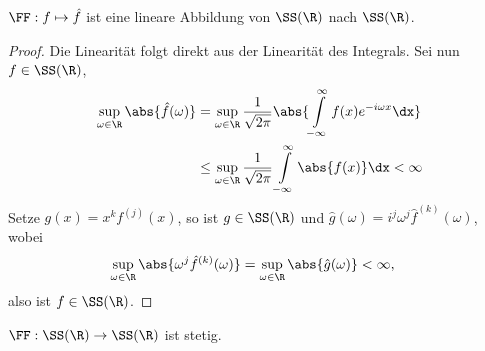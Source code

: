 \begin{prop}
\label{prop:2.9}
$\FF: f\mapsto \hat{f}$ ist eine lineare Abbildung von $\SS(\R)$ nach
$\SS(\R)$.\fishhere
\end{prop}
\begin{proof}
Die Linearität folgt direkt aus der Linearität des Integrals. Sei nun $f\in
\SS(\R)$,
\begin{align*}
\sup\limits_{\omega\in\R} \abs{\hat{f}(\omega)}
&=  \sup\limits_{\omega\in\R} \frac{1}{\sqrt{2\pi}}
\abs{\int\limits_{-\infty}^\infty f(x)e^{-i\omega x}\dx}\\
&\le \sup\limits_{\omega\in\R} \frac{1}{\sqrt{2\pi}}
\int\limits_{-\infty}^\infty \abs{f(x)}\dx <\infty
\end{align*}
Setze $g(x) = x^k f^{(j)}(x)$, so ist $g\in\SS(\R)$ und
$\hat{g}(\omega)=i^j\omega^j \hat{f}^{(k)}(\omega)$, wobei
\begin{align*}
\sup\limits_{\omega\in\R} \abs{\omega^j\hat{f}^{(k)}(\omega)} 
&= \sup\limits_{\omega\in\R} \abs{\hat{g}(\omega)} <\infty,
\end{align*}
also ist $f\in\SS(\R)$.\qedhere
\end{proof}

\begin{bem}
\label{bem:2.10}
$\FF: \SS(\R)\to\SS(\R)$ ist stetig.\maphere
\end{bem}

